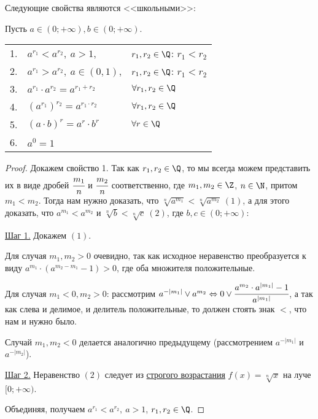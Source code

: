 \begin{note}
Следующие свойства являются <<школьными>>:

Пусть $a \in (0; +\infty), b \in (0; +\infty).$

\begin{table}[h]
\begin{tabular}{cll}
1. & $a^{r_{1}} < a^{r_{2}}, \ a > 1$, & $r_{1}, r_{2} \in \Q$: $r_{1} < r_{2}$ \\ 
2. & $a^{r_{1}} > a^{r_{2}}, \ a \in (0, 1)$, & $r_{1}, r_{2} \in \Q$: $r_{1} < r_{2}$ \\
3. & $a^{r_1} \cdot a^{r_{2}} = a^{r_{1} + r_{2}}$ & $\forall r_{1}, r_{2} \in \Q$ \\
4. & $\left(a^{r_{1}}\right)^{r_{2}} = a^{r_{1} \cdot r_{2}}$ & $\forall r_{1}, r_{2} \in \Q$ \\
5. & $\left(a \cdot b\right)^{r} = a^{r} \cdot b^{r}$ & $\forall r \in \Q$ \\
6. & $a^{0} = 1$ &  \\
\end{tabular}
\end{table}
\end{note}
\begin{proof}
    Докажем свойство 1. Так как $r_{1}, r_{2} \in \Q$, то мы всегда можем представить их в виде дробей $\cfrac{m_{1}}{n}$ и $\cfrac{m_{2}}{n}$ соответственно, где $m_{1}, m_{2} \in \Z$, $n \in \N$, притом $m_{1} < m_{2}$. Тогда нам нужно доказать, что $\sqrt[n]{a^{m_{1}}} < \sqrt[n]{a^{m_{2}}} \ (1)$, а для этого доказать, что $a^{m_{1}} < a^{m_{2}}$ и $\sqrt[n]{b} < \sqrt[n]{c} \ (2)$, где $b, c \in (0; +\infty)$:

    \underline{Шаг 1.} Докажем $(1)$. 
    
    Для случая $m_{1}, m_{2} > 0$ очевидно, так как исходное неравенство преобразуется к виду $a^{m_{1}} \cdot (a^{m_{2} - m_{1}} - 1) > 0$, где оба множителя положительные. 
    
    Для случая $m_{1} < 0, m_{2} > 0$: рассмотрим $a^{-|m_{1}|} \vee a^{m_{2}} \Leftrightarrow 0 \vee \cfrac{a^{m_{2}} \cdot a^{|m_{1}|} - 1}{a^{|m_{1}|}}$, а так как слева и делимое, и делитель положительные, то должен стоять знак $<$, что нам и нужно было.

    Случай $m_{1}, m_{2} < 0$ делается аналогично предыдущему (рассмотрением $a^{-|m_{1}|}$ и $a^{-|m_{2}|}$).

    \underline{Шаг 2.} Неравенство $(2)$ следует из \hyperlink{upppp}{строгого возрастания} $f (x) = \sqrt[n]{x}$ на луче $[0; +\infty)$.

    Объединяя, получаем $a^{r_{1}} < a^{r_{2}}, \ a > 1$, $r_{1}, r_{2} \in \Q$.
\end{proof}

